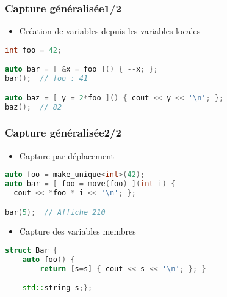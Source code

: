 \documentclass[C++.tex]{subfiles}
\begin{document}
\begin{frame}[fragile]
	\frametitle{Capture généralisée\titlehfill{}1/2}


	\begin{itemize}
		\item Création de variables depuis les variables locales
	\end{itemize}

	\begin{lstlisting}[language=C++]
int foo = 42;

auto bar = [ &x = foo ]() { --x; };
bar();  // foo : 41

auto baz = [ y = 2*foo ]() { cout << y << '\n'; };
baz();  // 82\end{lstlisting}
\end{frame}

\begin{frame}[fragile]
	\frametitle{Capture généralisée\titlehfill{}2/2}
	\begin{itemize}
		\item Capture par déplacement
	\end{itemize}
	
	\begin{lstlisting}[language=C++]
auto foo = make_unique<int>(42);
auto bar = [ foo = move(foo) ](int i) {
  cout << *foo * i << '\n'; };

bar(5);  // Affiche 210\end{lstlisting}

	\begin{itemize}
		\item Capture des variables membres
	\end{itemize}

	\begin{lstlisting}[language=C++]
struct Bar {
	auto foo() {
		return [s=s] { cout << s << '\n'; }; }

	std::string s;};\end{lstlisting}
\end{frame}
\end{document}
